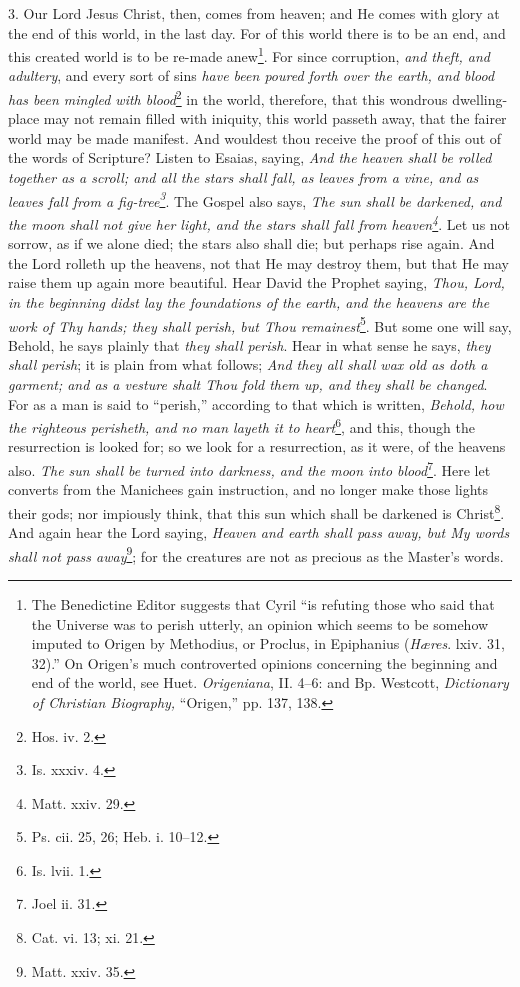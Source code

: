3. Our Lord Jesus Christ, then, comes from heaven; and He comes with glory at the end of this world, in the last day. For of this world there is to be an end, and this created world is to be re-made anew\footnote{The Benedictine Editor suggests that Cyril “is refuting those who said that the Universe was to perish utterly, an opinion which seems to be somehow imputed to Origen by Methodius, or Proclus, in Epiphanius (\emph{Hæres}. lxiv. 31, 32).” On Origen’s much controverted opinions concerning the beginning and end of the world, see Huet. \emph{Origeniana}, II. 4–6: and Bp. Westcott, \emph{Dictionary of Christian Biography,} “Origen,” pp. 137, 138.}. For since corruption, \emph{and theft, and adultery}, and every sort of sins \emph{have been poured forth over the earth, and blood has been mingled with blood}\footnote{Hos. iv. 2.} in the world, therefore, that this wondrous dwelling-place may not remain filled with iniquity, this world passeth away, that the fairer world may be made manifest. And wouldest thou receive the proof of this out of the words of Scripture? Listen to Esaias, saying, \emph{And the heaven shall be rolled together as a scroll; and all the stars shall fall, as leaves from a vine, and as leaves fall from a fig-tree\footnote{Is. xxxiv. 4.}}. The Gospel also says, \emph{The sun shall be darkened, and the moon shall not give her light, and the stars shall fall from heaven\footnote{Matt. xxiv. 29.}}. Let us not sorrow, as if we alone died; the stars also shall die; but perhaps rise again. And the Lord rolleth up the heavens, not that He may destroy them, but that He may raise them up again more beautiful. Hear David the Prophet saying, \emph{Thou, Lord, in the beginning didst lay the foundations of the earth, and the heavens are the work of Thy hands; they shall perish, but Thou remainest}\footnote{Ps. cii. 25, 26; Heb. i. 10–12.}. But some one will say, Behold, he says plainly that \emph{they shall perish}. Hear in what sense he says, \emph{they shall perish}; it is plain from what follows; \emph{And they all shall wax old as doth a garment; and as a vesture shalt Thou fold them up, and they shall be changed}. For as a man is said to “perish,” according to that which is written, \emph{Behold, how the righteous perisheth, and no man layeth it to heart}\footnote{Is. lvii. 1.}, and this, though the resurrection is looked for; so we look for a resurrection, as it were, of the heavens also. \emph{The sun shall be turned into darkness, and the moon into blood}\footnote{Joel ii. 31.}. Here let converts from the Manichees gain instruction, and no longer make those lights their gods; nor impiously think, that this sun which shall be darkened is Christ\footnote{Cat. vi. 13; xi. 21.}. And again hear the Lord saying, \emph{Heaven and earth shall pass away, but My words shall not pass away}\footnote{Matt. xxiv. 35.}; for the creatures are not as precious as the Master’s words.

